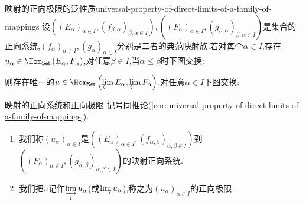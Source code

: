 \begin{corollary}{映射的正向极限的泛性质}{universal-property-of-direct-limits-of-a-family-of-mappings}
	设$\left(\left(E_{\alpha}\right)_{\alpha\in I},\left(f_{\beta,\alpha}\right)_{\beta,\alpha\in I}\right),\left(\left(F_{\alpha}\right)_{\alpha\in I},\left(g_{\beta,\alpha}\right)_{\beta,\alpha\in I}\right)$是集合的正向系统,$\left(f_{\alpha}\right)_{\alpha\in I},\left(g_{\alpha}\right)_{\alpha\in I}$分别是二者的典范映射族.若对每个$\alpha\in I$,存在$u_{\alpha}\in\Hom_{\mathsf{Set}}\left(E_{\alpha},F_{\alpha}\right)$,对任意$\beta\in I$,当$\alpha\leq\beta$时下图交换:
	\begin{center}
	\end{center}
	则存在唯一的$u\in\Hom_{\mathsf{Set}}\left(\varprojlim E_{\alpha},\varprojlim F_{\alpha}\right)$,对任意$\alpha\in I$下图交换:
	\begin{center}
	\end{center}
\end{corollary}

\begin{definition}{映射的正向系统和正向极限}{}
	记号同推论(\ref{cor:universal-property-of-direct-limits-of-a-family-of-mappings}).
	\begin{enumerate}
		\item 我们称$\left(u_{\alpha}\right)_{\alpha\in I}$是$\left(\left(E_{\alpha}\right)_{\alpha\in I},\left(f_{\alpha,\beta}\right)_{\alpha,\beta\in I}\right)$到$\left(\left(F_{\alpha}\right)_{\alpha\in I},\left(g_{\alpha,\beta}\right)_{\alpha,\beta\in I}\right)$的映射正向系统.
		\item 我们把$u$记作$\varinjlim\limits_{I}u_{\alpha}$(或$\varinjlim u_{\alpha}$),称之为$\left(u_{\alpha}\right)_{\alpha\in I}$的正向极限.
	\end{enumerate}
\end{definition}

